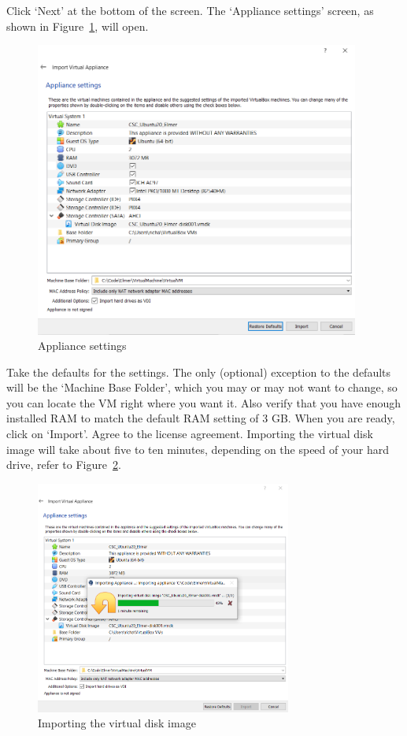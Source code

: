 Click `Next' at the bottom of the screen.  The `Appliance settings' screen, as shown in Figure~\ref{fg:virt-4}, will open.  

\begin{figure}[H]
\begin{center}
\includegraphics[width=0.95\textwidth]{virt-4}
\caption{Appliance settings}\label{fg:virt-4}
\end{center}
\end{figure}

Take the defaults for the settings.  The only (optional) exception to the defaults will be the `Machine Base Folder', which you may or may not want to change, so you can locate the VM right where you want it.  Also verify that you have enough installed RAM to match the default RAM setting of 3 GB.  When you are ready, click on `Import'.  Agree to the license agreement.  Importing the virtual disk image will take about five to ten minutes, depending on the speed of your hard drive, refer to Figure~\ref{fg:virt-5}.

\begin{figure}[H]
\begin{center}
\includegraphics[width=0.75\textwidth]{virt-5}
\caption{Importing the virtual disk image}\label{fg:virt-5}
\end{center}
\end{figure}

